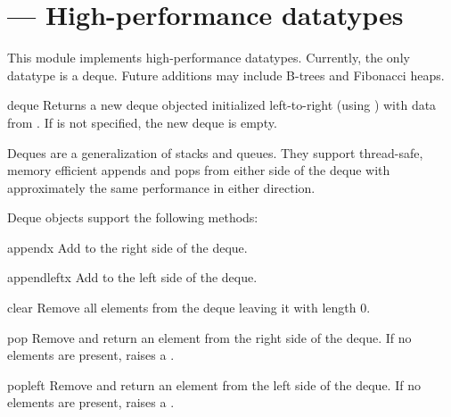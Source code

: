 \section{ ---
         High-performance datatypes}



This module implements high-performance datatypes.  Currently, the
only datatype is a deque.  Future additions may include B-trees
and Fibonacci heaps.

\begin{funcdesc}{deque}{}
  Returns a new deque objected initialized left-to-right (using
  ) with data from .  If 
  is not specified, the new deque is empty.

  Deques are a generalization of stacks and queues.  They support
  thread-safe, memory efficient appends and pops from either side of the
  deque with approximately the same performance in either direction.
\end{funcdesc}

Deque objects support the following methods:

\begin{methoddesc}{append}{x}
   Add  to the right side of the deque.
\end{methoddesc}

\begin{methoddesc}{appendleft}{x}
   Add  to the left side of the deque.
\end{methoddesc}

\begin{methoddesc}{clear}{}
   Remove all elements from the deque leaving it with length 0.
\end{methoddesc}

\begin{methoddesc}{pop}{}
   Remove and return an element from the right side of the deque.
   If no elements are present, raises a .
\end{methoddesc}

\begin{methoddesc}{popleft}{}
   Remove and return an element from the left side of the deque.
   If no elements are present, raises a .   
\end{methoddesc}


